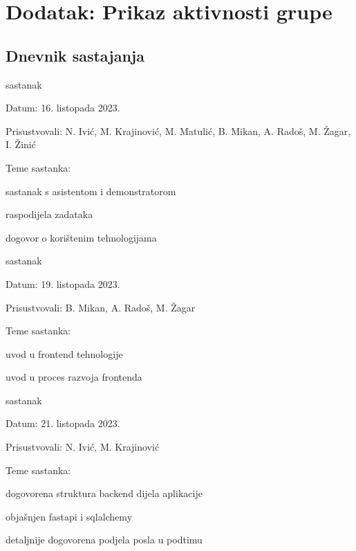 \chapter*{Dodatak: Prikaz aktivnosti grupe}
		
		\section*{Dnevnik sastajanja}
		
		
		\begin{packed_enum}
			\item  sastanak
			
			\item[] \begin{packed_item}
				\item Datum: 16. listopada 2023.
				\item Prisustvovali: N. Ivić, M. Krajinović, M. Matulić, B. Mikan, A. Radoš, M. Žagar, I. Žinić
				\item Teme sastanka:
				\begin{packed_item}
					\item  sastanak s asistentom i demonstratorom
					\item  raspodijela zadataka 
					\item  dogovor o korištenim tehnologijama
				\end{packed_item}
			\end{packed_item}
			
			\item  sastanak
			\item[] \begin{packed_item}
				\item Datum: 19. listopada 2023.
				\item Prisustvovali: B. Mikan, A. Radoš, M. Žagar
				\item Teme sastanka:
				\begin{packed_item}
					\item  uvod u frontend tehnologije
					\item  uvod u proces razvoja frontenda
				\end{packed_item}
			\end{packed_item}
			
			\item  sastanak
			\item[] \begin{packed_item}
				\item Datum: 21. listopada 2023.
				\item Prisustvovali: N. Ivić, M. Krajinović
				\item Teme sastanka:
				\begin{packed_item}
					\item  dogovorena struktura backend dijela aplikacije
					\item  objašnjen fastapi i sqlalchemy
					\item  detaljnije dogovorena podjela posla u podtimu
				\end{packed_item}
			\end{packed_item}


\end{packed_enum}
